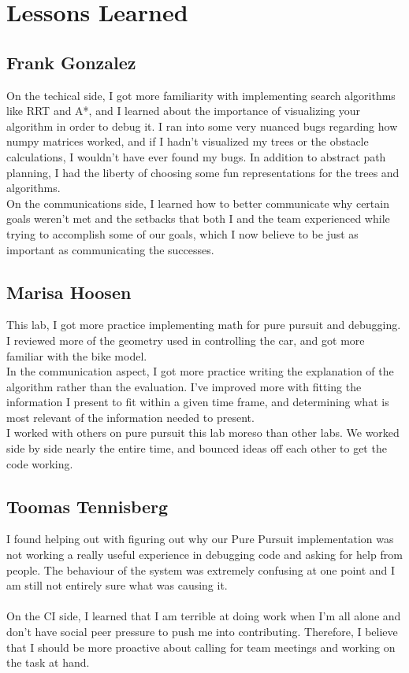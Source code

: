 \documentclass{article}
\begin{document}
\section{Lessons Learned}
\subsection{Frank Gonzalez}
On the techical side, I got more familiarity with implementing search algorithms like RRT and A*, and I learned about the importance of visualizing your algorithm in order to debug it. I ran into some very nuanced bugs regarding how numpy matrices worked, and if I hadn't visualized my trees or the obstacle calculations, I wouldn't have ever found my bugs. In addition to abstract path planning, I had the liberty of choosing some fun representations for the trees and algorithms.\\

On the communications side, I learned how to better communicate why certain goals weren't met and the setbacks that both I and the team experienced while trying to accomplish some of our goals, which I now believe to be just as important as communicating the successes. 

\subsection{Marisa Hoosen}
This lab, I got more practice implementing math for pure pursuit and debugging. I reviewed more of the geometry used in controlling the car, and got more familiar with the bike model.\\

In the communication aspect, I got more practice writing the explanation of the algorithm rather than the evaluation. I've improved more with fitting the information I present to fit within a given time frame, and determining what is most relevant of the information needed to present.\\

I worked with others on pure pursuit this lab moreso than other labs. We worked side by side nearly the entire time, and bounced ideas off each other to get the code working. 


\subsection{Toomas Tennisberg}
I found helping out with figuring out why our Pure Pursuit implementation was not working a really useful experience in debugging code and asking for help from people. The behaviour of the system was extremely confusing at one point and I am still not entirely sure what was causing it.\\\\
On the CI side, I learned that I am terrible at doing work when I'm all alone and don't have social peer pressure to push me into contributing. Therefore, I believe that I should be more proactive about calling for team meetings and working on the task at hand.
\end{document}
